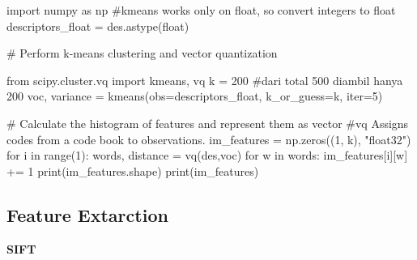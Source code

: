 \documentclass[
  letterpaper,
  DIV=11,
  numbers=noendperiod]{scrreprt}
\newenvironment{Shaded}{\begin{snugshade}}{\end{snugshade}}
\newcommand{\BuiltInTok}[1]{\textcolor[rgb]{0.00,0.23,0.31}{#1}}
\newcommand{\CommentTok}[1]{\textcolor[rgb]{0.37,0.37,0.37}{#1}}
\newcommand{\ControlFlowTok}[1]{\textcolor[rgb]{0.00,0.23,0.31}{#1}}
\newcommand{\DecValTok}[1]{\textcolor[rgb]{0.68,0.00,0.00}{#1}}
\newcommand{\ImportTok}[1]{\textcolor[rgb]{0.00,0.46,0.62}{#1}}
\newcommand{\KeywordTok}[1]{\textcolor[rgb]{0.00,0.23,0.31}{#1}}
\newcommand{\NormalTok}[1]{\textcolor[rgb]{0.00,0.23,0.31}{#1}}
\newcommand{\OperatorTok}[1]{\textcolor[rgb]{0.37,0.37,0.37}{#1}}
\newcommand{\StringTok}[1]{\textcolor[rgb]{0.13,0.47,0.30}{#1}}
\begin{document}
\begin{Shaded}
\begin{Highlighting}[]
\ImportTok{import}\NormalTok{ numpy }\ImportTok{as}\NormalTok{ np}
\CommentTok{\#kmeans works only on float, so convert integers to float}
\NormalTok{descriptors\_float }\OperatorTok{=}\NormalTok{ des.astype(}\BuiltInTok{float}\NormalTok{)  }

\CommentTok{\# Perform k{-}means clustering and vector quantization}

\ImportTok{from}\NormalTok{ scipy.cluster.vq }\ImportTok{import}\NormalTok{ kmeans, vq}
\NormalTok{k }\OperatorTok{=} \DecValTok{200}  \CommentTok{\#dari total 500 diambil hanya 200}
\NormalTok{voc, variance }\OperatorTok{=}\NormalTok{ kmeans(obs}\OperatorTok{=}\NormalTok{descriptors\_float, k\_or\_guess}\OperatorTok{=}\NormalTok{k, }\BuiltInTok{iter}\OperatorTok{=}\DecValTok{5}\NormalTok{) }


\CommentTok{\# Calculate the histogram of features and represent them as vector}
\CommentTok{\#vq Assigns codes from a code book to observations.}
\NormalTok{im\_features }\OperatorTok{=}\NormalTok{ np.zeros((}\DecValTok{1}\NormalTok{, k), }\StringTok{"float32"}\NormalTok{)}
\ControlFlowTok{for}\NormalTok{ i }\KeywordTok{in} \BuiltInTok{range}\NormalTok{(}\DecValTok{1}\NormalTok{):}
\NormalTok{    words, distance }\OperatorTok{=}\NormalTok{ vq(des,voc)}
    \ControlFlowTok{for}\NormalTok{ w }\KeywordTok{in}\NormalTok{ words:}
\NormalTok{        im\_features[i][w] }\OperatorTok{+=} \DecValTok{1}
\BuiltInTok{print}\NormalTok{(im\_features.shape)}
\BuiltInTok{print}\NormalTok{(im\_features)}
\end{Highlighting}
\end{Shaded}

\hypertarget{feature-extarction}{%
\subsection*{Feature Extarction}\label{feature-extarction}}

\textbf{SIFT}
\end{document}
